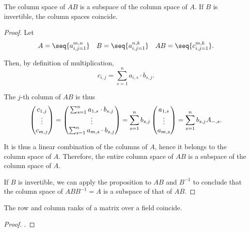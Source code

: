 \begin{lemma}\label{thm:matrix_product_column_space_subspace}
  The column space of \( AB \) is a subspace of the column space of \( A \). If \( B \) is invertible, the column spaces coincide.
\end{lemma}
\begin{proof}
  Let
  \begin{align*}
    A = \seq{ a_{i,j=1}^{m,n} }
    &&
    B = \seq{ a_{i,j=1}^{n,k} }
    &&
    AB = \seq{ c_{i,j=1}^{m,k} }.
  \end{align*}

  Then, by definition of multiplication,
  \begin{equation*}
    c_{i,j} = \sum_{s=1}^n a_{i,s} \cdot b_{s,j}.
  \end{equation*}

  The \( j \)-th column of \( AB \) is thus
  \begin{equation*}
    \begin{pmatrix}
      c_{1,j} \\
      \vdots \\
      c_{m,j}
    \end{pmatrix}
    =
    \begin{pmatrix}
      \sum_{s=1}^n a_{1,s} \cdot b_{s,j} \\
      \vdots \\
      \sum_{s=1}^n a_{m,s} \cdot b_{s,j}
    \end{pmatrix}
    =
    \sum_{s=1}^n b_{s,j}
    \begin{pmatrix}
      a_{1,s} \\
      \vdots \\
      a_{m,s}
    \end{pmatrix}
    =
    \sum_{s=1}^n b_{s,j} A_{\Anon*,s}.
  \end{equation*}

  It is thus a linear combination of the columns of \( A \), hence it belongs to the column space of \( A \). Therefore, the entire column space of \( AB \) is a subspace of the column space of \( A \).

  If \( B \) is invertible, we can apply the proposition to \( AB \) and \( B^{-1} \) to conclude that the column space of \( ABB^{-1} = A \) is a subspace of that of \( AB \).
\end{proof}

\begin{proposition}\label{thm:matrix_ranks_over_field_coincide}
  The row and column ranks of a matrix over a field coincide.
\end{proposition}
\begin{proof}
  .
\end{proof}

